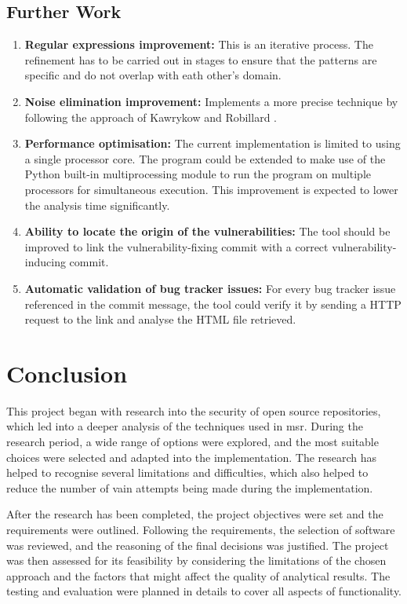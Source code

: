 \documentclass[12pt, a4paper]{report}
\begin{document}
\section{Further Work}
\begin{enumerate}
  \item \textbf{Regular expressions improvement:} This is an iterative process. The refinement has
  to be carried out in stages to ensure that the patterns are specific and do not overlap with eath
  other's domain.
  \item \textbf{Noise elimination improvement:} Implements a more precise technique by following the
  approach of Kawrykow and Robillard \cite{kawrykow_2011}.
  \item \textbf{Performance optimisation:} The current implementation is limited to using a single
  processor core. The program could be extended to make use of the Python built-in multiprocessing
  \cite{python_multiprocessing} module to run the program on multiple processors for simultaneous
  execution. This improvement is expected to lower the analysis time significantly.
  \item \textbf{Ability to locate the origin of the vulnerabilities:} The tool should be improved to
  link the vulnerability-fixing commit with a correct vulnerability-inducing commit.
  \item \textbf{Automatic validation of bug tracker issues:} For every bug tracker issue referenced
  in the commit message, the tool could verify it by sending a HTTP request to the link and analyse
  the HTML file retrieved.
\end{enumerate}

\chapter{Conclusion}
This project began with research into the security of open source repositories, which led into a
deeper analysis of the techniques used in \acrfull{msr}. During the research period, a wide range of
options were explored, and the most suitable choices were selected and adapted into the
implementation. The research has helped to recognise several limitations and difficulties, which
also helped to reduce the number of vain attempts being made during the implementation.

After the research has been completed, the project objectives were set and the requirements were
outlined. Following the requirements, the selection of software was reviewed, and the reasoning of
the final decisions was justified. The project was then assessed for its feasibility by considering
the limitations of the chosen approach and the factors that might affect the quality of analytical
results. The testing and evaluation were planned in details to cover all aspects of functionality.
\end{document}
